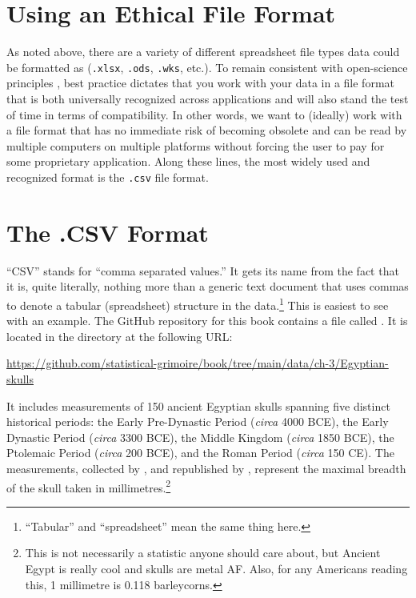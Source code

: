 \section{Using an Ethical File Format}
\label{sec:ethical_file}

As noted above, there are a variety of different spreadsheet file types data could be formatted as (\texttt{.xlsx}, \texttt{.ods}, \texttt{.wks}, etc.). To remain consistent with open-science principles \parencite{UNESCO_open_sci}, best practice dictates that you work with your data in a file format that is both universally recognized across applications and will also stand the test of time in terms of compatibility.  In other words, we want to (ideally) work with a file format that has no immediate risk of becoming obsolete and can be read by multiple computers on multiple platforms without forcing the user to pay for some proprietary application. Along these lines, the most widely used and recognized format is the \texttt{.csv} file format.

\section{The .CSV Format}

``CSV'' stands for ``comma separated values.'' It gets its name from the fact that it is, quite literally, nothing more than a generic text document that uses commas to denote a tabular (spreadsheet) structure in the data.\footnote{``Tabular'' and ``spreadsheet'' mean the same thing here.} This is easiest to see with an example. The GitHub repository for this book contains a file called . It is located in the  directory at the following URL:

\begin{center}
\url{https://github.com/statistical-grimoire/book/tree/main/data/ch-3/Egyptian-skulls}
\end{center}

\noindent
It includes measurements of 150 ancient Egyptian skulls spanning five distinct historical periods: the Early Pre-Dynastic Period (\textit{circa} 4000 BCE), the Early Dynastic Period (\textit{circa} 3300 BCE), the Middle Kingdom (\textit{circa} 1850 BCE), the Ptolemaic Period (\textit{circa} 200 BCE), and the Roman Period (\textit{circa} 150 CE). The measurements, collected by \textcite{Thomson1905}, and republished by \textcite{Manly1984}, represent the maximal breadth of the skull taken in millimetres.\footnote{This is not necessarily a statistic anyone should care about, but Ancient Egypt is really cool and skulls are metal AF. Also, for any Americans reading this, 1 millimetre is 0.118 barleycorns.}

